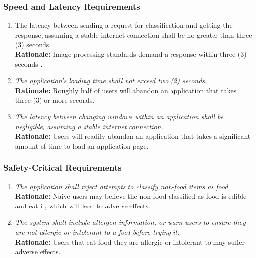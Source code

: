 \documentclass[]{article}
\begin{document}
\subsubsection{Speed and Latency Requirements}
\label{ssub:speed_and_latency_requirements}
\begin{enumerate}[{PR-SL}1. ]
	\item The latency between sending a request for classification and getting the response, assuming a stable internet connection shall be no greater than three (3) seconds. \\ \textbf{Rationale:} Image processing standards demand a response within three (3) seconds \cite{Umentis}.
    \item \textit{The application's loading time shall not exceed two (2) seconds}. \\ \textbf{Rationale:} Roughly half of users will abandon an application that takes three (3) or more seconds.\cite{StoryLy}
    \item \textit{The latency between changing windows within an application shall be negligible, assuming a stable internet connection.} \\ \textbf{Rationale:} Users will readily abandon an application that takes a significant amount of time to load an application page.
\end{enumerate}

\subsubsection{Safety-Critical Requirements}
\label{ssub:safety_critical_requirements}
\begin{enumerate}[{PR-SC}1. ]
	\item \textit{The application shall reject attempts to classify non-food items as food} \\ \textbf{Rationale:} Naive users may believe the non-food classified as food is edible and eat it, which will lead to adverse effects.
    \item \textit{The system shall include allergen information, or warn users to ensure they are not allergic or intolerant to a food before trying it.} \\ \textbf{Rationale:} Users that eat food they are allergic or intolerant to may suffer adverse effects.
\end{enumerate}
\end{document}
